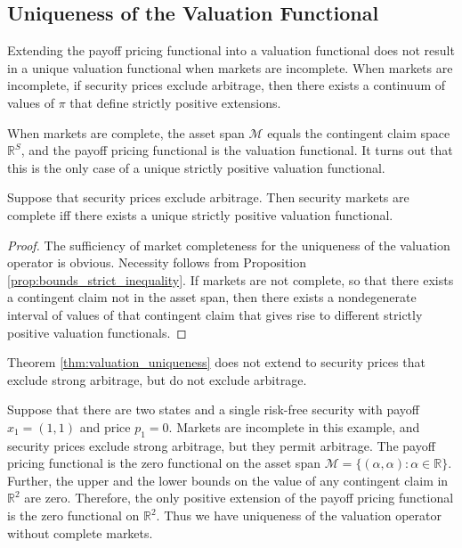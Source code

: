 \documentclass[\topdir/lecture\_notes.tex]{subfiles}
\begin{document}
\subsection{Uniqueness of the Valuation Functional}
Extending the payoff pricing functional into a valuation functional does not result in a unique valuation functional when markets are incomplete. When markets are incomplete, if security prices exclude arbitrage, then there exists a continuum of values of $\pi$ that define strictly positive extensions.

When markets are complete, the asset span $\mathcal{M}$ equals the contingent claim space $\mathbb{R}^{S}$, and the payoff pricing functional is the valuation functional. It turns out that this is the only case of a unique strictly positive valuation functional.

\begin{theorem}\label{thm:valuation_uniqueness}
Suppose that security prices exclude arbitrage. Then security markets are complete iff there exists a unique strictly positive valuation functional.
\end{theorem}
\begin{proof}
The sufficiency of market completeness for the uniqueness of the valuation operator is obvious. Necessity follows from Proposition \ref{prop:bounds_strict_inequality}. If markets are not complete, so that there exists a contingent claim not in the asset span, then there exists a nondegenerate interval of values of that contingent claim that gives rise to different strictly positive valuation functionals.
\end{proof}
Theorem \ref{thm:valuation_uniqueness} does not extend to security prices that exclude strong arbitrage, but do not exclude arbitrage.
\begin{example}\label{ex:zero_price_security}
Suppose that there are two states and a single risk-free security with payoff $x_{1}=(1,1)$ and price $p_{1}=0$. Markets are incomplete in this example, and security prices exclude strong arbitrage, but they permit arbitrage. The payoff pricing functional is the zero functional on the asset span $\mathcal{M}=\{(\alpha, \alpha) \colon \alpha \in \mathbb{R}\}$. Further, the upper and the lower bounds on the value of any contingent claim in $\mathbb{R}^{2}$ are zero. Therefore, the only positive extension of the payoff pricing functional is the zero functional on $\mathbb{R}^{2}$. Thus we have uniqueness of the valuation operator without complete markets.
\end{example}
\end{document}
